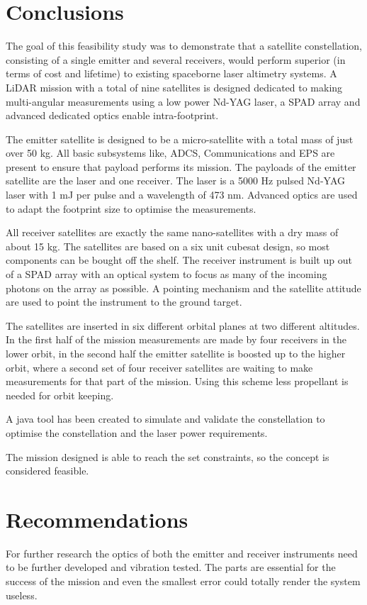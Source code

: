 \section{Conclusions}
\label{frCRconclusions}
The goal of this feasibility study was to demonstrate that a satellite constellation, consisting of a single emitter and several receivers, would perform
superior (in terms of cost and lifetime) to existing spaceborne laser altimetry systems. A \ac{LiDAR} mission with a total of nine satellites is designed dedicated to making multi-angular measurements using a low power \ac{Nd-YAG} \ac{laser}, a \ac{SPAD} array and advanced dedicated optics enable intra-footprint. 

The emitter satellite is designed to be a micro-satellite with a total mass of just over 50 kg. All basic subsystems like, \ac{ADCS}, Communications and \ac{EPS} are present to ensure that payload performs its mission. The payloads of the emitter satellite are the \ac{laser} and one receiver. The \ac{laser} is a 5000 Hz pulsed \ac{Nd-YAG} \ac{laser} with 1 mJ per pulse and a wavelength of 473 nm. Advanced optics are used to adapt the footprint size to optimise the measurements.

All receiver satellites are exactly the same nano-satellites with a dry mass of about 15 kg. The satellites are based on a six unit cubesat design, so most components can be bought off the shelf. The receiver instrument is built up out of a \ac{SPAD} array with an optical system to focus as many of the incoming photons on the array as possible. A pointing mechanism and the satellite attitude are used to point the instrument to the ground target.

The satellites are inserted in six different orbital planes at two different altitudes. In the first half of the mission measurements are made by four receivers in the lower orbit, in the second half the emitter satellite is boosted up to the higher orbit, where a second set of four receiver satellites are waiting to make measurements for that part of the mission. Using this scheme less propellant is needed for orbit keeping.

A java tool has been created to simulate and validate the constellation to optimise the constellation and the laser power requirements.

The mission designed is able to reach the set constraints, so the concept is considered feasible.

\section{Recommendations}
\label{frCRrecommendations}
For further research the optics of both the emitter and receiver instruments need to be further developed and vibration tested. The parts are essential for the success of the mission and even the smallest error could totally render the system useless.

